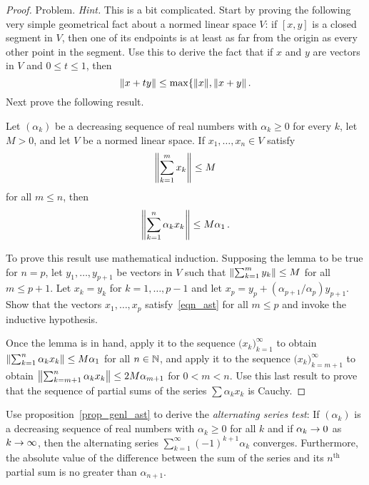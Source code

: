 \begin{proof} Problem.   \emph{Hint.}  This is a bit complicated.  Start by proving the
following very simple geometrical fact about a normed linear space $V$: if $[x,y]$ is a closed
segment in $V$, then one of its endpoints is at least as far from the origin as every other
point in the segment.  Use this to derive the fact that if $x$ and $y$ are vectors in $V$ and
$0 \le t \le 1$, then
  \[ \lVert x + ty\rVert \le \max\{\lVert x\rVert,\lVert x + y\rVert\,. \]
Next prove the following result.

\begin{lem}  Let $(\alpha_k)$ be a decreasing sequence of real numbers with $\alpha_k \ge 0$
for every $k$, let $M > 0$, and let $V$ be a normed linear space.  If $x_1,\dots,x_n \in
V$ satisfy
  \begin{equation}\label{eqn_ast}
                  \left\lVert\sum_{k=1}^m x_k\right\rVert \le M
  \end{equation}
for all $m \le n$, then
  \[ \left\lVert\sum_{k=1}^n \alpha_k x_k\right\rVert \le M\alpha_1\,. \]
\end{lem}

To prove this result use mathematical induction.  Supposing the lemma to be true for $n = p$,
let $y_1,\dots,y_{p+1}$ be vectors in $V$ such that $\left\lVert\sum_{k=1}^m y_k\right\rVert \le M$ for all
$m \le p+1$.  Let $x_k = y_k$ for $k = 1,\dots,p-1$ and let $x_p = y_p +
(\alpha_{p+1}/\alpha_p)y_{p+1}$.  Show that the vectors $x_1,\dots,x_p$
satisfy~\eqref{eqn_ast} for all $m \le p$ and invoke the inductive hypothesis.

Once the lemma is in hand, apply it to the sequence $\bigl(x_k\bigr)_{k=1}^\infty$ to obtain
$\left\lVert\sum_{k=1}^n \alpha_k x_k\right\rVert \le M\alpha_1$ for all $n \in \mathbb{N}$, and apply it to the
sequence $\bigl(x_k\bigr)_{k=m+1}^\infty$ to obtain $\left\lVert\sum_{k = m+1}^n\alpha_kx_k\right\rVert \le
2M\alpha_{m+1}$ for $0 < m < n$.  Use this last result to prove that the sequence of partial
sums of the series $\sum\alpha_k x_k$ is Cauchy. \ns
\end{proof}

\begin{prob}\label{prob_ast} Use proposition~\ref{prop_genl_ast} to derive the \emph{alternating
series test}: If $(\alpha_k)$ is a decreasing sequence of real numbers with $\alpha_k \ge 0$
for all $k$ and if $\alpha_k \rightarrow 0$ as $k \rightarrow \infty$, then the alternating series
$\sum_{k=1}^\infty (-1)^{k+1}\alpha_k$ converges. Furthermore, the absolute value of the
difference between the sum of the series and its $n^{\text{th}}$ partial sum is no greater
than $\alpha_{n+1}$.
\end{prob}

